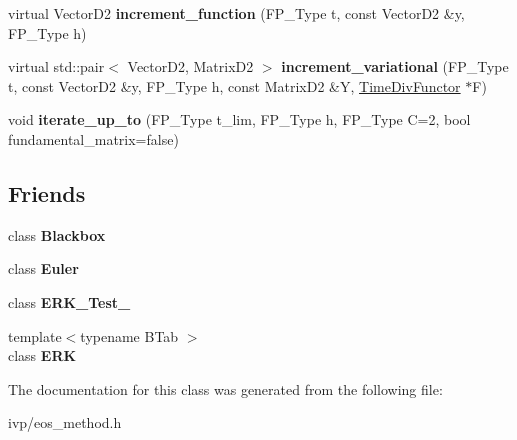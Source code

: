 \begin{DoxyCompactItemize}
virtual Vector\+D2 {\bfseries increment\+\_\+function} (F\+P\+\_\+\+Type t, const Vector\+D2 \&y, F\+P\+\_\+\+Type h)
\item 
\mbox{\label{classOneStepMethod_ae5eff75de4c6a05f94e130e1739b9b21}} 
virtual std\+::pair$<$ Vector\+D2, Matrix\+D2 $>$ {\bfseries increment\+\_\+variational} (F\+P\+\_\+\+Type t, const Vector\+D2 \&y, F\+P\+\_\+\+Type h, const Matrix\+D2 \&Y, \hyperlink{classTimeDivFunctor}{Time\+Div\+Functor} $\ast$F)
\item 
\mbox{\label{classOneStepMethod_aca930b0b14490b0a019958ff3d1d54a0}} 
void {\bfseries iterate\+\_\+up\+\_\+to} (F\+P\+\_\+\+Type t\+\_\+lim, F\+P\+\_\+\+Type h, F\+P\+\_\+\+Type C=2, bool fundamental\+\_\+matrix=false)
\end{DoxyCompactItemize}
\subsection*{Friends}
\begin{DoxyCompactItemize}
\item 
\mbox{\label{classOneStepMethod_af3aa570b8e278b935d7dc84d2774ccb7}} 
class {\bfseries Blackbox}
\item 
\mbox{\label{classOneStepMethod_a9e8c94ebada889fba517c82fc3408d32}} 
class {\bfseries Euler}
\item 
\mbox{\label{classOneStepMethod_a146a867264afb1cda48fa788ceca1f13}} 
class {\bfseries E\+R\+K\+\_\+\+Test\+\_}
\item 
\mbox{\label{classOneStepMethod_a55adbdc4c0fea0e770e4d18b0379d490}} 
{\footnotesize template$<$typename B\+Tab $>$ }\\class {\bfseries E\+RK}
\end{DoxyCompactItemize}


The documentation for this class was generated from the following file\+:\begin{DoxyCompactItemize}
\item 
ivp/eos\+\_\+method.\+h\end{DoxyCompactItemize}
